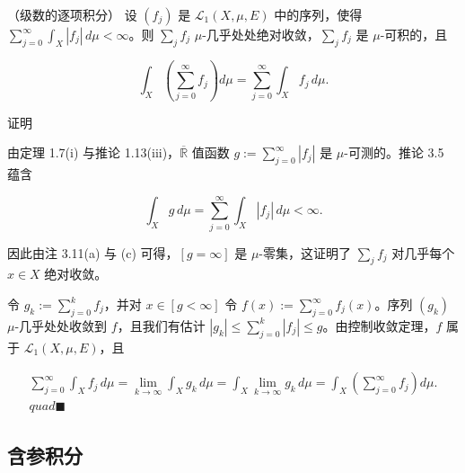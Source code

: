 \begin{theorem}

（级数的逐项积分） 设 $ (f_j) $ 是 $ \mathcal{L}_1(X,\mu,E) $ 中的序列，使得 $ \sum_{j=0}^{\infty} \int_X |f_j| \, d\mu < \infty $。则 $ \sum_j f_j $ $ \mu $-几乎处处绝对收敛，$ \sum_j f_j $ 是 $ \mu $-可积的，且

\[
\int_X \left( \sum_{j=0}^{\infty} f_j \right) d\mu = \sum_{j=0}^{\infty} \int_X f_j \, d\mu.
\]

证明

\begin{subitems}
\item

由定理 1.7(i) 与推论 1.13(iii)，$ \overline{\mathbb{R}} $ 值函数 $ g := \sum_{j=0}^{\infty} |f_j| $ 是 $ \mu $-可测的。推论 3.5 蕴含

\[
\int_X g \, d\mu = \sum_{j=0}^{\infty} \int_X |f_j| \, d\mu < \infty.
\]

\begin{items}
\item

因此由注 3.11(a) 与 (c) 可得，$ [g = \infty] $ 是 $ \mu $-零集，这证明了 $ \sum_j f_j $ 对几乎每个 $ x \in X $ 绝对收敛。

\end{items}

\item

令 $ g_k := \sum_{j=0}^{k} f_j $，并对 $ x \in [g < \infty] $ 令 $ f(x) := \sum_{j=0}^{\infty} f_j(x) $。序列 $ (g_k) $ $ \mu $-几乎处处收敛到 $ f $，且我们有估计 $ |g_k| \le \sum_{j=0}^{k} |f_j| \le g $。由控制收敛定理，$ f $ 属于 $ \mathcal{L}_1(X,\mu,E) $，且

\begin{equation*}
\begin{aligned}
\sum_{j=0}^{\infty} \int_X f_j \, d\mu = \lim_{k \to \infty} \int_X g_k \, d\mu = \int_X \lim_{k \to \infty} g_k \, d\mu = \int_X \left( \sum_{j=0}^{\infty} f_j \right) d\mu. \\quad\blacksquare
\end{aligned}
\end{equation*}
\end{subitems}

\end{theorem}

\subsection*{含参积分}


